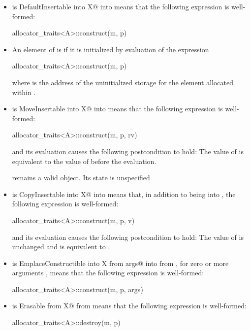 \begin{itemize}
\item
{} is 
{DefaultInsertable into X@ into }
means that the following expression is well-formed:
\begin{codeblock}
allocator_traits<A>::construct(m, p)
\end{codeblock}

\item
An element of  is  if it is initialized
by evaluation of the expression
\begin{codeblock}
allocator_traits<A>::construct(m, p)
\end{codeblock}
where  is the address of the uninitialized storage for the element
allocated within .
	
\item
{} is 
{MoveInsertable into X@ into }
means that the following expression
is well-formed:
\begin{codeblock}
allocator_traits<A>::construct(m, p, rv)
\end{codeblock}
and its evaluation causes the following postcondition to hold: The value
of  is equivalent to the value of  before the evaluation.
\begin{note}  remains a valid object. Its state is unspecified \end{note}

\item
{} is 
{CopyInsertable into X@ into }
means that, in addition to  being  into
, the following expression is well-formed:
\begin{codeblock}
allocator_traits<A>::construct(m, p, v)
\end{codeblock}
and its evaluation causes the following postcondition to hold:
The value of  is unchanged and is equivalent to .

\item
{} is
{EmplaceConstructible into X from args@ into  from },
for zero
or more arguments , means that the following expression is well-formed:
\begin{codeblock}
allocator_traits<A>::construct(m, p, args)
\end{codeblock}

\item
{} is
{Erasable from X@ from }
means that the following expression is well-formed:
\begin{codeblock}
allocator_traits<A>::destroy(m, p)
\end{codeblock}
\end{itemize}

